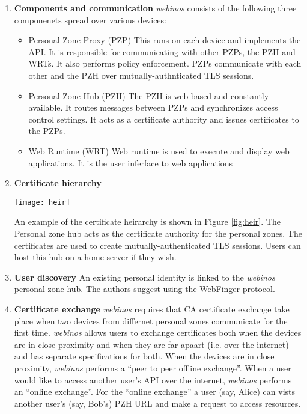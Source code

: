 \begin{enumerate}[label=\arabic*., wide, labelwidth=!, labelindent=0pt]
	\item \textbf{Components and communication} \textit{webinos} consists of the following three componenets spread over various devices:
	\begin{itemize}
			\item Personal Zone Proxy (PZP) This runs on each device and implements the API. It is responsible for communicating with other PZPs, 					the PZH and WRTs. It also performs policy enforcement. PZPs communicate with each other and the PZH over mutually-authnticated TLS 					sessions.
			\item Personal Zone Hub (PZH) The PZH is web-based and constantly available. It routes messages between PZPs and synchronizes access 				control settings. It acts as a certificate authority and issues certificates to the PZPs.
			\item Web Runtime (WRT) Web runtime is used to execute and display web applications. It is the user inferface to web applications
	\end{itemize}

	\item \textbf{Certificate hierarchy}
		\begin{figure*}[!h]
			\centering
			\texttt{[image: heir]}
			\caption{Certificate heirarchy in \textit{webinos} \cite{Lyle2013}}
			\label{fig:heir}
		\end{figure*}
		An example of the certificate heirarchy is shown in Figure \ref{fig:heir}. The Personal zone hub acts as the certificate authority for the 					personal zones. The certificates are used to create mutually-authenticated TLS sessions. Users can host this hub on a home server if they 				wish.

	\item \textbf{User discovery} An existing personal identity is linked to the \textit{webinos} personal zone hub. The authors suggest using the 		WebFinger protocol\cite{Webfinger}.
	
	\item \textbf{Certificate exchange} \textit{webinos} requires that CA certificate exchange take place when two devices from differnet 					personal zones communicate for the first time. \textit{webinos} allows users to exchange certificates both when the devices are in close 				proximity and when they are far apaart (i.e. over the internet) and has separate specifications for both. When the devices are in close 						proximity, \textit{webinos} performs a ``peer to peer offline exchange''. When a user would like to access another user's API over the 					internet, \textit{webinos} performs an ``online exchange''. For the ``online exchange'' a user (say, Alice) can vists another user's (say, Bob's) 	PZH URL and make a request to access resources. 
	

\end{enumerate}
